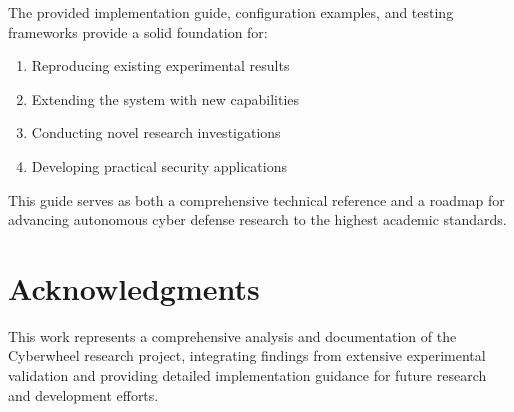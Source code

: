 \documentclass[12pt,a4paper]{article}
\begin{document}
The provided implementation guide, configuration examples, and testing frameworks provide a solid foundation for:

\begin{enumerate}
    \item Reproducing existing experimental results
    \item Extending the system with new capabilities
    \item Conducting novel research investigations
    \item Developing practical security applications
\end{enumerate}

This guide serves as both a comprehensive technical reference and a roadmap for advancing autonomous cyber defense research to the highest academic standards.

\section*{Acknowledgments}

This work represents a comprehensive analysis and documentation of the Cyberwheel research project, integrating findings from extensive experimental validation and providing detailed implementation guidance for future research and development efforts.
\end{document}
